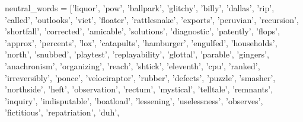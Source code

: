 \documentclass[12pt,]{book}
\newenvironment{Shaded}{\begin{snugshade}}{\end{snugshade}}
\newcommand{\StringTok}[1]{\textcolor[rgb]{0.31,0.60,0.02}{#1}}
\newcommand{\NormalTok}[1]{#1}
\begin{document}
\vspace{1mm} \scriptsize

\begin{Shaded}
\begin{Highlighting}[]
\NormalTok{neutral_words =}\StringTok{ }\NormalTok{[}\StringTok{'liquor'}\NormalTok{, }\StringTok{'pow'}\NormalTok{, }\StringTok{'ballpark'}\NormalTok{, }\StringTok{'glitchy'}\NormalTok{, }\StringTok{'billy'}\NormalTok{, }\StringTok{'dallas'}\NormalTok{, }
                 \StringTok{'rip'}\NormalTok{, }\StringTok{'called'}\NormalTok{, }\StringTok{'outlooks'}\NormalTok{, }\StringTok{'viet'}\NormalTok{, }\StringTok{'floater'}\NormalTok{, }\StringTok{'rattlesnake'}\NormalTok{, }\StringTok{'exports'}\NormalTok{,}
                 \StringTok{'peruvian'}\NormalTok{, }\StringTok{'recursion'}\NormalTok{, }\StringTok{'shortfall'}\NormalTok{, }\StringTok{'corrected'}\NormalTok{, }\StringTok{'amicable'}\NormalTok{,}
                 \StringTok{'solutions'}\NormalTok{, }\StringTok{'diagnostic'}\NormalTok{, }\StringTok{'patently'}\NormalTok{, }\StringTok{'flops'}\NormalTok{, }\StringTok{'approx'}\NormalTok{, }\StringTok{'percents'}\NormalTok{,}
                \StringTok{'lox'}\NormalTok{, }\StringTok{'catapults'}\NormalTok{, }\StringTok{'hamburger'}\NormalTok{, }\StringTok{'engulfed'}\NormalTok{, }\StringTok{'households'}\NormalTok{, }\StringTok{'north'}\NormalTok{,}
                \StringTok{'snubbed'}\NormalTok{, }\StringTok{'playtest'}\NormalTok{, }\StringTok{'replayability'}\NormalTok{, }\StringTok{'glottal'}\NormalTok{, }\StringTok{'parable'}\NormalTok{, }\StringTok{'gingers'}\NormalTok{,}
                \StringTok{'anachronism'}\NormalTok{, }\StringTok{'organizing'}\NormalTok{, }\StringTok{'reach'}\NormalTok{, }\StringTok{'shtick'}\NormalTok{, }\StringTok{'eleventh'}\NormalTok{, }\StringTok{'cpu'}\NormalTok{, }\StringTok{'ranked'}\NormalTok{,}
                \StringTok{'irreversibly'}\NormalTok{, }\StringTok{'ponce'}\NormalTok{, }\StringTok{'velociraptor'}\NormalTok{, }\StringTok{'rubber'}\NormalTok{, }\StringTok{'defects'}\NormalTok{, }\StringTok{'puzzle'}\NormalTok{,}
                \StringTok{'smasher'}\NormalTok{, }\StringTok{'northside'}\NormalTok{, }\StringTok{'heft'}\NormalTok{, }\StringTok{'observation'}\NormalTok{, }\StringTok{'rectum'}\NormalTok{, }\StringTok{'mystical'}\NormalTok{,}
                \StringTok{'telltale'}\NormalTok{, }\StringTok{'remnants'}\NormalTok{, }\StringTok{'inquiry'}\NormalTok{, }\StringTok{'indisputable'}\NormalTok{, }\StringTok{'boatload'}\NormalTok{, }\StringTok{'lessening'}\NormalTok{,}
                \StringTok{'uselessness'}\NormalTok{, }\StringTok{'observes'}\NormalTok{, }\StringTok{'fictitious'}\NormalTok{, }\StringTok{'repatriation'}\NormalTok{, }\StringTok{'duh'}\NormalTok{,}

\end{Highlighting}
\end{Shaded}
\end{document}
